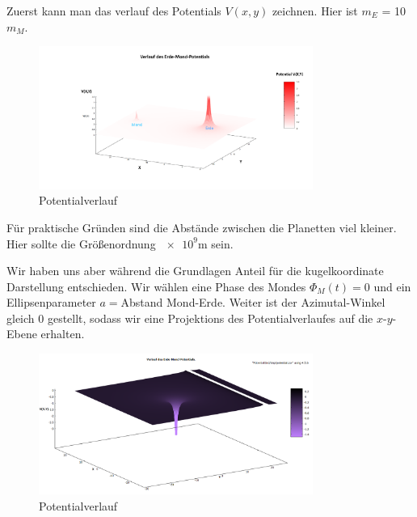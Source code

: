 \documentclass{subfiles}
\begin{document}
    Zuerst kann man das verlauf des Potentials $V(x,y)$ zeichnen. Hier ist $m_{E}$ = 10 \cdot $m_{M}$.
    \begin{figure}[H]
        \centering
        \includegraphics[width=0.8\textwidth]{../Ressource/PotentialVerlauf.png}
        \caption{Potentialverlauf}
        \label{fig:Potential}
    \end{figure}
    Für praktische Gründen sind die Abstände zwischen die Planetten viel kleiner. Hier sollte die Größenordnung $\num{e9}$m sein.\newline

    Wir haben uns aber während die Grundlagen Anteil für die kugelkoordinate Darstellung entschieden. Wir wählen eine Phase des Mondes
    $\Phi_M(t) = 0$ und ein Ellipsenparameter $a = $Abstand Mond-Erde. Weiter ist der Azimutal-Winkel gleich 0 gestellt, sodass wir eine Projektions
    des Potentialverlaufes auf die $x$-$y$-Ebene erhalten.
    \begin{figure}[H]
        \centering
        \includegraphics[width=0.8\textwidth]{../Ressource/PotentialVerlaufKugel.png}
        \caption{Potentialverlauf}
        \label{fig:Potential}
    \end{figure}
\end{document}

